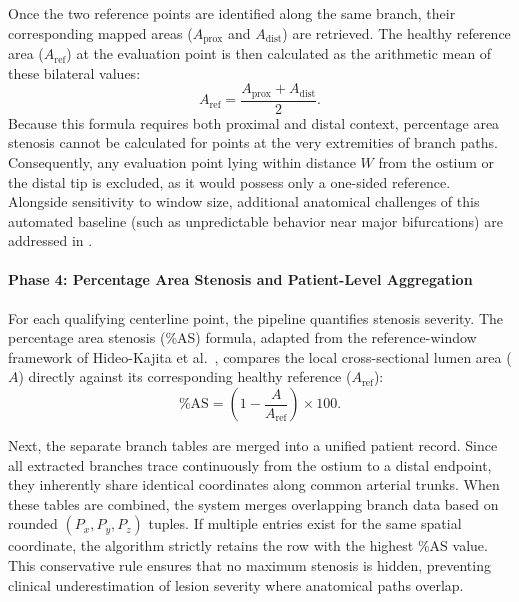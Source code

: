 Once the two reference points are identified along the same branch, their corresponding mapped areas ($A_{\mathrm{prox}}$ and $A_{\mathrm{dist}}$) are retrieved. The healthy reference area ($A_{\mathrm{ref}}$) at the evaluation point is then calculated as the arithmetic mean of these bilateral values:
\begin{equation}
  A_{\mathrm{ref}} = \frac{A_{\mathrm{prox}} + A_{\mathrm{dist}}}{2}.
  \label{eq:area-reference}
\end{equation}
Because this formula requires both proximal and distal context, percentage area stenosis cannot be calculated for points at the very extremities of branch paths. Consequently, any evaluation point lying within distance $W$ from the ostium or the distal tip is excluded, as it would possess only a one-sided reference. Alongside sensitivity to window size, additional anatomical challenges of this automated baseline (such as unpredictable behavior near major bifurcations) are addressed in .

\paragraph{Phase 4: Percentage Area Stenosis and Patient-Level Aggregation}\mbox{}\par\vspace{0.5em}
For each qualifying centerline point, the pipeline quantifies stenosis severity. The percentage area stenosis (\%AS) formula, adapted from the reference-window framework of Hideo-Kajita et al.~\cite{hideo_kajita2019}, compares the local cross-sectional lumen area ($A$) directly against its corresponding healthy reference ($A_{\mathrm{ref}}$):
\begin{equation}
  \%\mathrm{AS} = \left(1 - \frac{A}{A_{\mathrm{ref}}}\right) \times 100.
  \label{eq:pct-as}
\end{equation}

Next, the separate branch tables are merged into a unified patient record. Since all extracted branches trace continuously from the ostium to a distal endpoint, they inherently share identical coordinates along common arterial trunks. When these tables are combined, the system merges overlapping branch data based on rounded $(P_x, P_y, P_z)$ tuples. If multiple entries exist for the same spatial coordinate, the algorithm strictly retains the row with the highest \%AS value. This conservative rule ensures that no maximum stenosis is hidden, preventing clinical underestimation of lesion severity where anatomical paths overlap.

